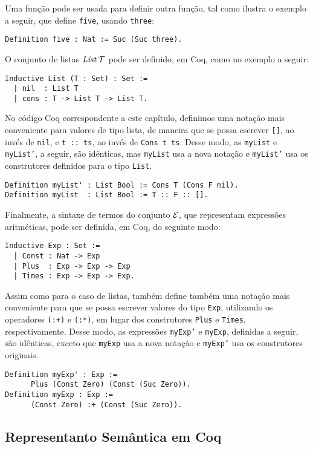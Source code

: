 Uma função pode ser usada para definir outra função, tal como ilustra o exemplo a seguir, que define \texttt{five}, usando \texttt{three}: 
\begin{lstlisting}
Definition five : Nat := Suc (Suc three).
\end{lstlisting}

O conjunto de listas $\textit{List\/}\,\mathcal{T}$ pode ser definido, em Coq, como no exemplo a seguir: 
\begin{lstlisting}
Inductive List (T : Set) : Set :=
  | nil  : List T
  | cons : T -> List T -> List T.
\end{lstlisting}

No código Coq correspondente a este capítulo, definimos uma nota\c{c}\~ao mais conveniente para valores de tipo lista, de maneira que se possa escrever \texttt{[]}, ao inv\'es de \texttt{nil}, e \texttt{t :: ts}, ao inv\'es de \texttt{Cons t ts}. Desse modo, as \texttt{myList} e \texttt{myList'}, a seguir, s\~ao id\^enticas, mas \texttt{myList} usa a nova notação e \texttt{myList'} usa os construtores definidos para o tipo \texttt{List}.
\begin{lstlisting}
Definition myList' : List Bool := Cons T (Cons F nil).
Definition myList  : List Bool := T :: F :: [].
\end{lstlisting}

Finalmente, a  sintaxe de termos do conjunto $\mathcal{E}$, que representam express\~oes aritm\'eticas, pode ser definida, em Coq, do seguinte modo:
\begin{lstlisting}
Inductive Exp : Set :=
  | Const : Nat -> Exp
  | Plus  : Exp -> Exp -> Exp
  | Times : Exp -> Exp -> Exp.
\end{lstlisting}


Assim como para o caso de listas, também define também uma notação mais conveniente para que se possa escrever valores do tipo \texttt{Exp}, utilizando os operadores \texttt{(:+)} e \texttt{(:*)}, em lugar dos construtores \texttt{Plus} e \texttt{Times}, respectivamente. Desse modo, as expressões \texttt{myExp'} e \texttt{myExp}, definidas a seguir, são idênticas, exceto que \texttt{myExp} usa a nova notação e \texttt{myExp'} usa os construtores originais.
\begin{lstlisting}
Definition myExp' : Exp := 
      Plus (Const Zero) (Const (Suc Zero)).
Definition myExp : Exp := 
      (Const Zero) :+ (Const (Suc Zero)).
\end{lstlisting}

\subsection{Representanto Sem\^antica em Coq}

